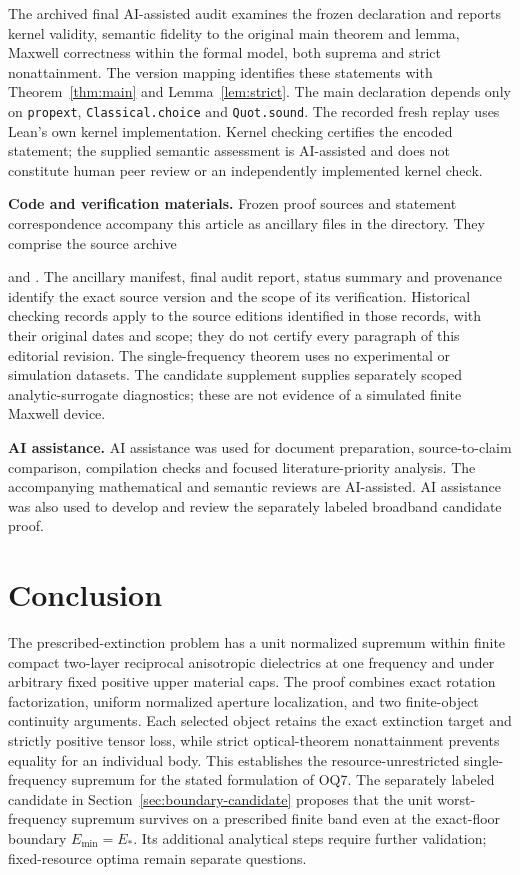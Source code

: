 \documentclass[11pt]{article}
\begin{document}
The archived final AI-assisted audit examines the frozen declaration and reports kernel validity, semantic fidelity to the original main theorem and lemma, Maxwell correctness within the formal model, both suprema and strict nonattainment. The version mapping identifies these statements with Theorem~\ref{thm:main} and Lemma~\ref{lem:strict}. The main declaration depends only on \texttt{propext}, \texttt{Classical.choice} and \texttt{Quot.sound}. The recorded fresh replay uses Lean's own kernel implementation. Kernel checking certifies the encoded statement; the supplied semantic assessment is AI-assisted and does not constitute human peer review or an independently implemented kernel check.

\noindent\textbf{Code and verification materials.}
Frozen proof sources and statement correspondence accompany this article as ancillary files in the  directory. They comprise the source archive
\begin{center}\small{}\end{center}
and . The ancillary manifest, final audit report, status summary and provenance identify the exact source version and the scope of its verification. Historical checking records apply to the source editions identified in those records, with their original dates and scope; they do not certify every paragraph of this editorial revision. The single-frequency theorem uses no experimental or simulation datasets. The candidate supplement supplies separately scoped analytic-surrogate diagnostics; these are not evidence of a simulated finite Maxwell device.

\noindent\textbf{AI assistance.}
AI assistance was used for document preparation, source-to-claim comparison, compilation checks and focused literature-priority analysis. The accompanying mathematical and semantic reviews are AI-assisted. AI assistance was also used to develop and review the separately labeled broadband candidate proof.

\section{Conclusion}\label{sec:conclusion}
The prescribed-extinction problem has a unit normalized supremum within finite compact two-layer reciprocal anisotropic dielectrics at one frequency and under arbitrary fixed positive upper material caps. The proof combines exact rotation factorization, uniform normalized aperture localization, and two finite-object continuity arguments. Each selected object retains the exact extinction target and strictly positive tensor loss, while strict optical-theorem nonattainment prevents equality for an individual body. This establishes the resource-unrestricted single-frequency supremum for the stated formulation of OQ7. The separately labeled candidate in Section~\ref{sec:boundary-candidate} proposes that the unit worst-frequency supremum survives on a prescribed finite band even at the exact-floor boundary $E_{\min}=E_*$. Its additional analytical steps require further validation; fixed-resource optima remain separate questions.
\end{document}
